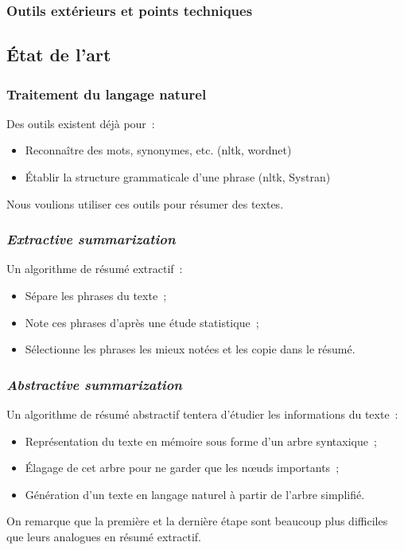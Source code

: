 \documentclass[12pt, handout]{beamer}
\begin{document}
\begin{frame}
 \frametitle{Outils extérieurs et points techniques}
 
\end{frame}


\subsection{État de l'art}

\begin{frame}
 \frametitle{Traitement du langage naturel}
 Des outils existent déjà pour~:
 \begin{itemize}
  \item Reconnaître des mots, synonymes, etc. (nltk, wordnet)
  \item Établir la structure grammaticale d'une phrase (nltk, Systran)
 \end{itemize}
 Nous voulions utiliser ces outils pour résumer des textes.
 
\end{frame}

\begin{frame}
 \frametitle{\textit{Extractive summarization}}
 Un algorithme de résumé extractif~:
 \begin{itemize}
  \item Sépare les phrases du texte~;
  \item Note ces phrases d'après une étude statistique~;
  \item Sélectionne les phrases les mieux notées et les copie dans le résumé.
 \end{itemize}
 
\end{frame}

\begin{frame}
 \frametitle{\textit{Abstractive summarization}}
 Un algorithme de résumé abstractif tentera d'étudier les informations du texte~:
 \begin{itemize}
  \item Représentation du texte en mémoire sous forme d'un arbre syntaxique~;
  \item Élagage de cet arbre pour ne garder que les nœuds importants~;
  \item Génération d'un texte en langage naturel à partir de l'arbre simplifié.
 \end{itemize}
 On remarque que la première et la dernière étape sont beaucoup plus difficiles que leurs analogues en résumé extractif.
\end{frame}
\end{document}
